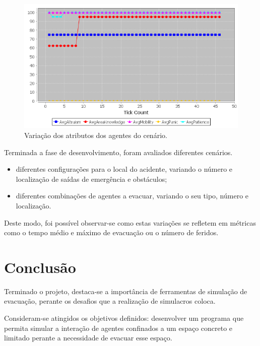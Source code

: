 \documentclass[12pt]{article}
\begin{document}
\begin{titlepage}
\begin{itemize}
	\begin{figure}[H]
	\centering
	\includegraphics{directions_test.png}
	\caption{Variação dos atributos dos agentes do cenário.}
	\label{directions_graph}
\end{figure}
	
	
	
\end{itemize}


Terminada a fase de desenvolvimento, foram avaliados diferentes cenários.
\begin{itemize}
	\item diferentes configurações para o local do acidente, variando o número e localização de saídas de emergência e obstáculos;
	\item diferentes combinações de agentes a evacuar, variando o seu tipo, número e localização.
\end{itemize}

Deste modo, foi possível observar-se como estas variações se refletem em métricas como o tempo médio e máximo de evacuação ou o número de feridos.

\newpage
\section{Conclusão}

Terminado o projeto, destaca-se a importância de ferramentas de simulação de evacuação, perante os desafios que a realização de simulacros coloca.

Consideram-se atingidos os objetivos definidos: desenvolver um programa que permita simular a interação de agentes confinados a um espaço concreto e limitado perante a necessidade de evacuar esse espaço.


\end{titlepage}
\end{document}
